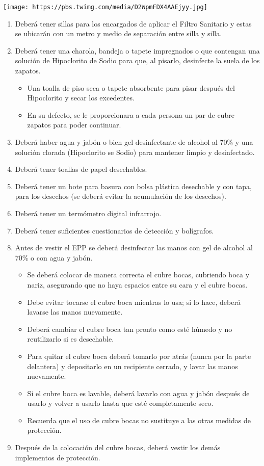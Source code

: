 \documentclass[]{article}
\providecommand{\tightlist}{%
  \setlength{\itemsep}{0pt}\setlength{\parskip}{0pt}}
\begin{document}
\texttt{[image: https://pbs.twimg.com/media/D2WpmFDX4AAEjyy.jpg]}

\begin{enumerate}
\def\labelenumi{\arabic{enumi}.}
\tightlist
\item
  Deberá tener sillas para los encargados de aplicar el Filtro Sanitario
  y estas se ubicarán con un metro y medio de separación entre silla y
  silla.
\item
  Deberá tener una charola, bandeja o tapete impregnados o que contengan
  una solución de Hipoclorito de Sodio para que, al pisarlo, desinfecte
  la suela de los zapatos.

  \begin{itemize}
  \tightlist
  \item
    Una toalla de piso seca o tapete absorbente para pisar después del
    Hipoclorito y secar los excedentes.
  \item
    En su defecto, se le proporcionara a cada persona un par de cubre
    zapatos para poder continuar.
  \end{itemize}
\item
  Deberá haber agua y jabón o bien gel desinfectante de alcohol al 70\%
  y una solución clorada (Hipoclorito se Sodio) para mantener limpio y
  desinfectado.
\item
  Deberá tener toallas de papel desechables.
\item
  Deberá tener un bote para basura con bolsa plástica desechable y con
  tapa, para los desechos (se deberá evitar la acumulación de los
  desechos).
\item
  Deberá tener un termómetro digital infrarrojo.
\item
  Deberá tener suficientes cuestionarios de detección y bolígrafos.
\item
  Antes de vestir el EPP se deberá desinfectar las manos con gel de
  alcohol al 70\% o con agua y jabón.

  \begin{itemize}
  \tightlist
  \item
    Se deberá colocar de manera correcta el cubre bocas, cubriendo boca
    y nariz, asegurando que no haya espacios entre su cara y el cubre
    bocas.
  \item
    Debe evitar tocarse el cubre boca mientras lo usa; si lo hace,
    deberá lavarse las manos nuevamente.
  \item
    Deberá cambiar el cubre boca tan pronto como esté húmedo y no
    reutilizarlo si es desechable.
  \item
    Para quitar el cubre boca deberá tomarlo por atrás (nunca por la
    parte delantera) y depositarlo en un recipiente cerrado, y lavar las
    manos nuevamente.
  \item
    Si el cubre boca es lavable, deberá lavarlo con agua y jabón después
    de usarlo y volver a usarlo hasta que esté completamente seco.
  \item
    Recuerda que el uso de cubre bocas no sustituye a las otras medidas
    de protección.
  \end{itemize}
\item
  Después de la colocación del cubre bocas, deberá vestir los demás
  implementos de protección.


\end{enumerate}
\end{document}

